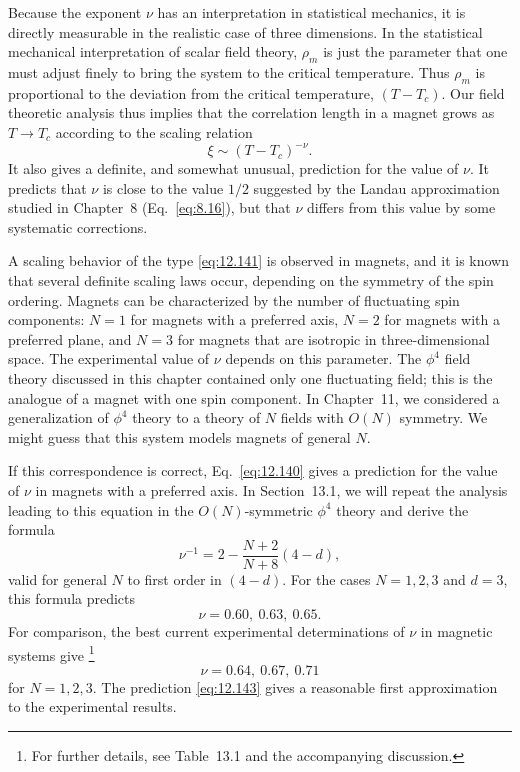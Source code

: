 Because the exponent $\nu$ has an interpretation in statistical mechanics, it
is directly measurable in the realistic case of three dimensions.  In the
statistical mechanical interpretation of scalar field theory, $\rho_m$ is
just the parameter that one must adjust finely to bring the system to the
critical temperature.  Thus $\rho_m$ is proportional to the deviation from
the critical temperature, $(T-T_c)$.  Our field theoretic analysis thus
implies that the correlation length in a magnet grows as $T\to T_c$ according
to the scaling relation
\begin{equation}
  \xi \sim (T-T_c)^{-\nu} .
  \label{eq:12.141}
\end{equation}
It also gives a definite, and somewhat unusual, prediction for the value of
$\nu$.  It predicts that $\nu$ is close to the value $1/2$ suggested by the
Landau approximation studied in Chapter~8 (Eq.~\eqref{eq:8.16}), but that
$\nu$ differs from this value by some systematic corrections.

A scaling behavior of the type \eqref{eq:12.141} is observed in magnets, and
it is known that several definite scaling laws occur, depending on the
symmetry of the spin ordering.  Magnets can be characterized by the number of
fluctuating spin components: $N=1$ for magnets with a preferred axis, $N=2$
for magnets with a preferred plane, and $N=3$ for magnets that are isotropic
in three-dimensional space.  The experimental value of $\nu$ depends on this
parameter.  The $\phi^4$ field theory discussed in this chapter contained
only one fluctuating field; this is the analogue of a magnet with one spin
component.  In Chapter~11, we considered a generalization of $\phi^4$ theory
to a theory of $N$ fields with $O(N)$ symmetry.  We might guess that this
system models magnets of general $N$.

If this correspondence is correct, Eq.~\eqref{eq:12.140} gives a prediction
for the value of $\nu$ in magnets with a preferred axis.  In Section~13.1, we
will repeat the analysis leading to this equation in the $O(N)$-symmetric
$\phi^4$ theory and derive the formula
\begin{equation}
  \nu^{-1} = 2 - \frac{N+2}{N+8}(4-d) ,
  \label{eq:12.142}
\end{equation}
valid for general $N$ to first order in $(4-d)$.  For the cases $N = 1, 2, 3$
and $d = 3$, this formula predicts
\begin{equation}
  \nu = 0.60,\ 0.63,\ 0.65 .
  \label{eq:12.143}
\end{equation}
For comparison, the best current experimental determinations of $\nu$ in
magnetic systems give%
\footnote{For further details, see Table~13.1 and the accompanying
discussion.}
\begin{equation}
  \nu = 0.64,\ 0.67,\ 0.71
  \label{eq:12.144}
\end{equation}
for $N = 1, 2, 3$.  The prediction \eqref{eq:12.143} gives a reasonable first
approximation to the experimental results.

